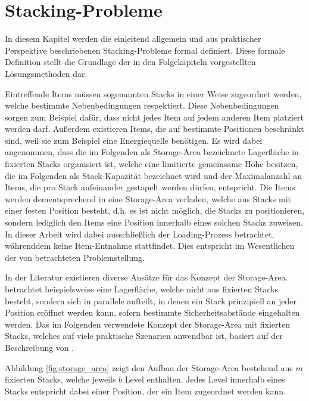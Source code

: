 \section{Stacking-Probleme}
\label{sec:stacking_problems}

In diesem Kapitel werden die einleitend allgemein und aus praktischer Perspektive beschriebenen Stacking-Probleme
formal definiert. Diese formale Definition stellt die Grundlage der in den Folgekapiteln vorgestellten Lösungsmethoden dar.

Eintreffende Items müssen sogenannten Stacks in einer Weise zugeordnet werden, welche bestimmte Nebenbedingungen respektiert.
Diese Nebenbedingungen sorgen zum Beispiel dafür, dass nicht jedes Item auf jedem anderen Item platziert werden
darf. Außerdem existieren Items, die auf bestimmte Positionen beschränkt sind, weil sie zum Beispiel eine Energiequelle benötigen. Es wird dabei angenommen, dass die im Folgenden als Storage-Area bezeichnete Lagerfläche in fixierten
Stacks organisiert ist, welche eine limitierte gemeinsame Höhe besitzen, die im Folgenden als Stack-Kapazität bezeichnet wird
und der Maximalanzahl an Items, die pro Stack aufeinander gestapelt werden dürfen, entspricht.
Die Items werden dementsprechend in eine Storage-Area verladen, welche aus Stacks mit einer festen Position besteht,
d.h. es ist nicht möglich, die Stacks zu positionieren, sondern lediglich den Items eine Position innerhalb eines solchen
Stacks zuweisen. In dieser Arbeit wird dabei ausschließlich der Loading-Prozess betrachtet, währenddem keine
Item-Entnahme stattfindet. Dies entspricht im Wesentlichen der von \citet{Bruns2015} betrachteten Problemstellung.

In der Literatur existieren diverse Ansätze für das Konzept der Storage-Area.
\citet{Jaehn2013} betrachtet beispielsweise eine Lagerfläche, welche nicht aus fixierten Stacks besteht,
sondern sich in parallele  aufteilt, in denen ein Stack prinzipiell an jeder Position eröffnet werden kann, sofern bestimmte Sicherheitsabstände eingehalten werden.
Das im Folgenden verwendete Konzept der Storage-Area mit fixierten Stacks, welches auf viele praktische
Szenarien anwendbar ist, basiert auf der Beschreibung von \citet{Lehnfeld2014}.

Abbildung \ref{fig:storage_area} zeigt den Aufbau der Storage-Area bestehend aus $m$ fixierten
Stacks, welche jeweils $b$ Level enthalten. Jedes Level innerhalb eines Stacks entspricht dabei einer Position,
der ein Item zugeordnet werden kann.

